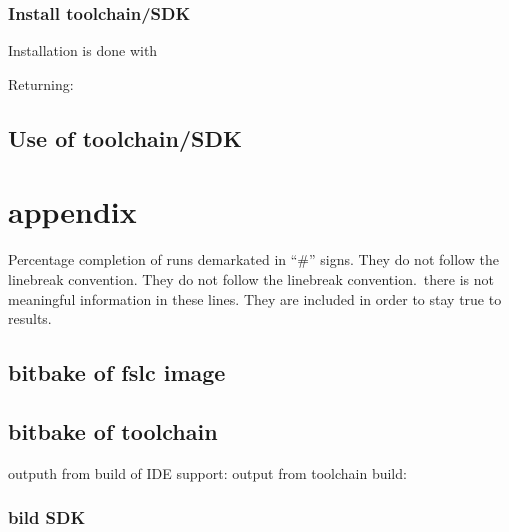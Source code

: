\documentclass[10pt]{article}
\begin{document}
\subsubsection{Install toolchain/SDK}
Installation is done with

Returning:


\subsection{Use of toolchain/SDK}


\newpage
\section{appendix}
Percentage completion of runs demarkated in ``\#'' signs. They do not follow the linebreak convention.
They do not follow the linebreak convention.\ there is not meaningful information in these lines. They
are included in order to stay true to results.

\subsection{bitbake of fslc image}
\label{app:GUIImage}

\subsection{bitbake of toolchain}
outputh from build of IDE support:
\label{app:toolChainIDESupport}
output from toolchain build:
\label{app:toolChainBuild}
\subsubsection{bild SDK}
\label{app:toolChainSDK}

%
\end{document}
